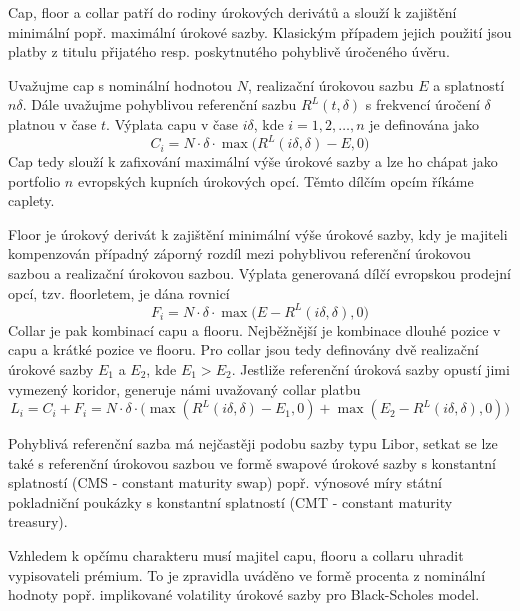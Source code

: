 \documentclass[a4paper]{book}
\begin{document}
Cap, floor a collar patří do rodiny úrokových derivátů a slouží k zajištění minimální popř. maximální úrokové sazby. Klasickým případem jejich použití jsou platby z titulu přijatého resp. poskytnutého pohyblivě úročeného úvěru.

Uvažujme cap s nominální hodnotou $N$, realizační úrokovou sazbu $E$ a splatností $n \delta$. Dále uvažujme pohyblivou referenční sazbu $R^L(t, \delta)$ s frekvencí úročení $\delta$ platnou v čase $t$. Výplata capu v čase $i \delta$, kde $i = 1, 2, \dots, n$ je definována jako
\begin{equation*}
C_i = N \cdot \delta \cdot \max \big(R^L(i \delta, \delta) - E, 0 \big)
\end{equation*}  
Cap tedy slouží k zafixování maximální výše úrokové sazby a lze ho chápat jako portfolio $n$ evropských kupních úrokových opcí. Těmto dílčím opcím říkáme caplety.

Floor je úrokový derivát k zajištění minimální výše úrokové sazby, kdy je majiteli kompenzován případný záporný rozdíl mezi pohyblivou referenční úrokovou sazbou a realizační úrokovou sazbou. Výplata generovaná dílčí evropskou prodejní opcí, tzv. floorletem, je dána rovnicí
\begin{equation*}
F_i = N \cdot \delta \cdot \max \big(E - R^L(i \delta, \delta), 0 \big)
\end{equation*}
Collar je pak kombinací capu a flooru. Nejběžnější je kombinace dlouhé pozice v capu a krátké pozice ve flooru. Pro collar jsou tedy definovány dvě realizační úrokové sazby $E_1$ a $E_2$, kde $E_1 > E_2$. Jestliže referenční úroková sazby opustí jimi vymezený koridor, generuje námi uvažovaný collar platbu
\begin{equation*}
L_i = C_i + F_i = N \cdot \delta \cdot \big(\max(R^L(i \delta, \delta) - E_1, 0) + \max(E_2 - R^L(i \delta, \delta), 0) \big)
\end{equation*}

Pohyblivá referenční sazba má nejčastěji podobu sazby typu Libor, setkat se lze také s referenční úrokovou sazbou ve formě swapové úrokové sazby s konstantní splatností (CMS - constant maturity swap) popř. výnosové míry státní pokladniční poukázky s konstantní splatností (CMT - constant maturity treasury).

Vzhledem k opčímu charakteru musí majitel capu, flooru a collaru uhradit vypisovateli prémium. To je zpravidla uváděno ve formě procenta z nominální hodnoty popř. implikované volatility úrokové sazby pro Black-Scholes model.
\end{document}
